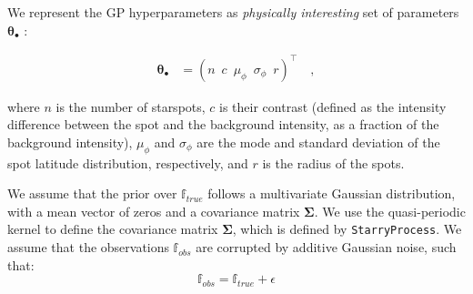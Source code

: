 \documentclass[twocolumn]{aastex631}
\begin{document}
We represent the GP hyperparameters as \emph{physically interesting} set of parameters $\pmb{\theta}_\bullet$ \citep{Luger2021b}:
%
\begin{linenomath}\begin{align}
        \label{eq:thetaspot}
        \pmb{\theta}_\bullet
         & =
        \left(
        n
        \,\,\,
        c
        \,\,\,
        \mu_\phi
        \,\,\,
        \sigma_\phi
        \,\,\,
        r
        \right)^\top
        \quad,
    \end{align}\end{linenomath}
%
where $n$ is the number of starspots, $c$ is their contrast (defined as the intensity difference between the spot and the 
background intensity, as a fraction of the background intensity),
$\mu_\phi$ and $\sigma_\phi$ are the mode and standard deviation
of the spot latitude distribution, respectively, and $r$ is the radius
of the spots.

We assume that the prior over $\mathbb{f}_{true}$ follows a multivariate Gaussian distribution, with a mean vector of zeros and a covariance 
matrix $\pmb{\Sigma}$. We use the quasi-periodic kernel to define the covariance matrix $\pmb{\Sigma}$, which is defined by \texttt{StarryProcess}.
We assume that the observations $\mathbb{f}_{obs}$ are corrupted by additive Gaussian noise, such that:
\begin{equation}
    \mathbb{f}_{obs} = \mathbb{f}_{true} + \epsilon
\end{equation}
\end{document}
